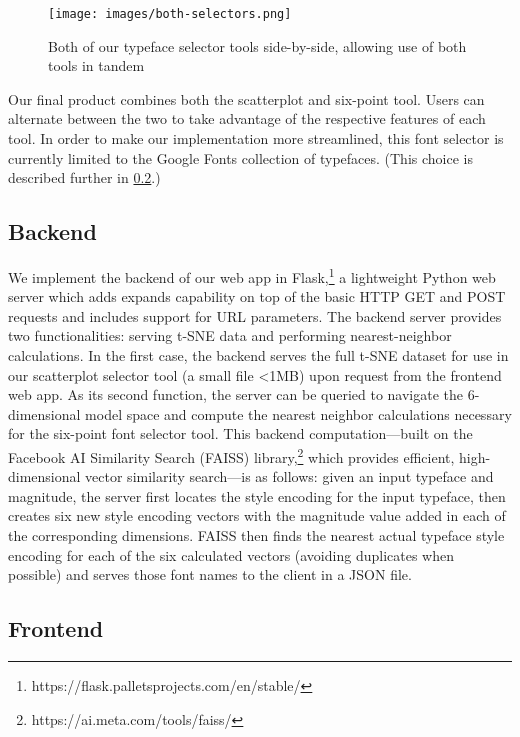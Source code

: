 \begin{figure}[h]
    \centering
    \texttt{[image: images/both-selectors.png]}
    \caption{Both of our typeface selector tools side-by-side, allowing use of both tools in tandem}
    \label{fig:both-selectors}
\end{figure}

Our final product combines both the scatterplot and six-point tool. Users can alternate between the two to take advantage of the respective features of each tool. In order to make our implementation more streamlined, this font selector is currently limited to the Google Fonts collection of typefaces. (This choice is described further in \ref{frontend}.)

\subsection{Backend}

We implement the backend of our web app in Flask,\footnote{https://flask.palletsprojects.com/en/stable/} a lightweight Python web server which adds expands capability on top of the basic HTTP GET and POST requests and includes support for URL parameters. The backend server provides two functionalities: serving t-SNE data and performing nearest-neighbor calculations. In the first case, the backend serves the full t-SNE dataset for use in our scatterplot selector tool (a small file <1MB) upon request from the frontend web app. As its second function, the server can be queried to navigate the 6-dimensional model space and compute the nearest neighbor calculations necessary for the six-point font selector tool. This backend computation—built on the Facebook AI Similarity Search (FAISS) library,\footnote{https://ai.meta.com/tools/faiss/} which provides efficient, high-dimensional vector similarity search—is as follows: given an input typeface and magnitude, the server first locates the style encoding for the input typeface, then creates six new style encoding vectors with the magnitude value added in each of the corresponding dimensions. FAISS then finds the nearest actual typeface style encoding for each of the six calculated vectors (avoiding duplicates when possible) and serves those font names to the client in a JSON file.

\subsection{Frontend} \label{frontend}

